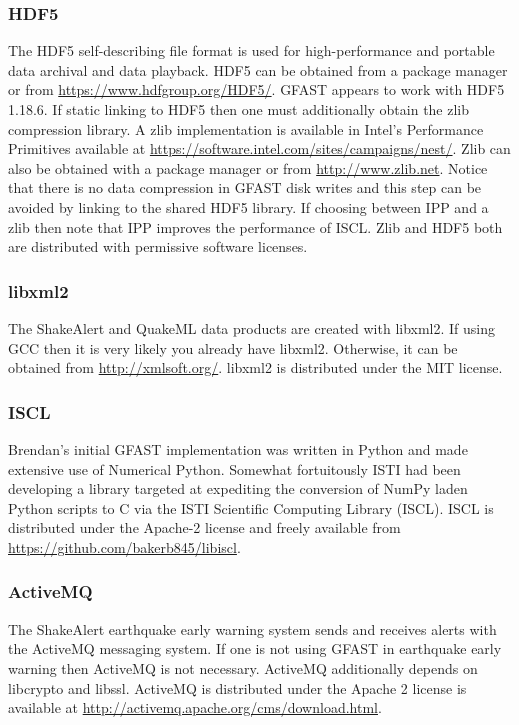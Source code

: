 \documentclass[12pt]{article}
\begin{document}
\subsubsection{HDF5}
The HDF5 self-describing file format is used for high-performance and portable data archival and
data playback.  HDF5 can be obtained from a package manager or from 
\url{https://www.hdfgroup.org/HDF5/}. 
GFAST appears to work with HDF5 1.18.6.  If static linking to HDF5 then one must additionally 
obtain the zlib compression library.  A zlib implementation is available in Intel's 
Performance Primitives available at \url{https://software.intel.com/sites/campaigns/nest/}.  Zlib
can also be obtained with a package manager or from \url{http://www.zlib.net}.  
Notice that there is no data compression in GFAST disk writes and this step can be avoided by
linking to the shared HDF5 library.  If choosing between IPP and a zlib then note that
IPP improves the performance of ISCL.   Zlib and HDF5 both are distributed with permissive
software licenses.

\subsubsection{libxml2}
The ShakeAlert and QuakeML data products are created with libxml2.  If using GCC then it
is very likely you already have libxml2.  Otherwise, it can be obtained from 
\url{http://xmlsoft.org/}.  libxml2 is distributed under the MIT license. 

\subsubsection{ISCL}
Brendan's initial GFAST implementation was written in Python and made extensive use of 
Numerical Python.  Somewhat fortuitously ISTI had been developing a library targeted 
at expediting the conversion of NumPy laden Python scripts to C via the ISTI Scientific
Computing Library (ISCL).  ISCL is distributed under the Apache-2 license and 
freely available from \url{https://github.com/bakerb845/libiscl}.

\subsubsection{ActiveMQ}
The ShakeAlert earthquake early warning system sends and receives alerts with the ActiveMQ
messaging system.  If one is not using GFAST in earthquake early warning then ActiveMQ
is not necessary.  ActiveMQ additionally depends on libcrypto and libssl.  ActiveMQ is
distributed under the Apache 2 license is available at
\url{http://activemq.apache.org/cms/download.html}. 
\end{document}
